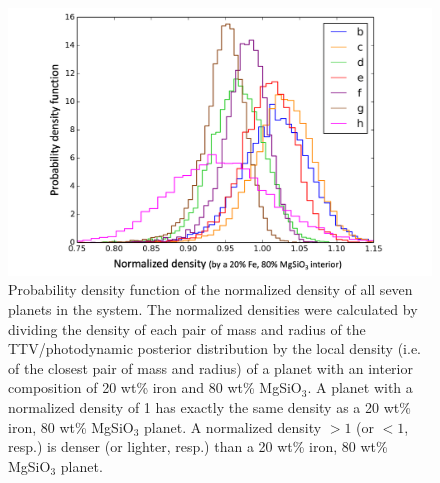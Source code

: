 \documentclass[twocolumn]{aastex63}
\begin{document}
\begin{figure}
    \centering
    \includegraphics[width=\hsize]{figures/figure_TTV_norm_density_histograms.png}
    \caption{Probability density function of the normalized density of all seven planets in the system.
    The normalized densities were calculated by dividing the density of each pair of mass and radius of the TTV/photodynamic posterior distribution by the local density (i.e. of the closest pair of mass and radius) of a planet with an interior composition of 20 wt\% iron and 80 wt\% MgSiO$_3$. A planet with a normalized density of 1 has exactly the same density as a 20 wt\% iron, 80 wt\% MgSiO$_3$ planet. A normalized density ${>}1$ (or ${<}1$, resp.) is denser (or lighter, resp.) than a 20 wt\% iron, 80 wt\% MgSiO$_3$ planet.}
    \label{fig:norm_density_histo}
\end{figure}
\end{document}
